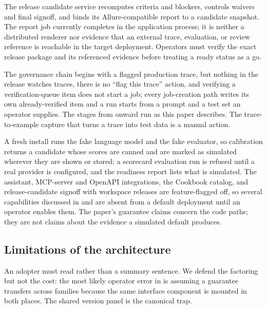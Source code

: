  The release
candidate service recomputes criteria and blockers, controls waivers and final
signoff, and binds its Allure-compatible report to a candidate snapshot.  The
report job currently completes in the application process; it is neither a
distributed renderer nor evidence that an external trace, evaluation, or review
reference is reachable in the target deployment.  Operators must verify the exact
release package and its referenced evidence before treating a ready status as a go.

 The governance chain
begins with a flagged production trace, but nothing in the release watches traces,
there is no ``flag this trace'' action, and verifying a verification-queue item does
not start a job; every job-creation path writes its own already-verified item and a
run starts from a prompt and a test set an operator supplies. The stages from
 onward run as this paper describes. The trace-to-example capture that
turns a trace into test data is a manual action.

 A fresh install runs
the fake language model and the fake evaluator, so calibration returns a candidate
whose scores are canned and are marked as simulated wherever they are shown or
stored; a scorecard evaluation run is refused until a real provider is configured,
and the readiness report lists what is simulated. The \aria{} assistant, MCP-server
and OpenAPI integrations, the Cookbook catalog, and release-candidate signoff with
workspace releases are feature-flagged off, so several capabilities discussed in
 and  are absent from a default
deployment until an operator enables them. The paper's guarantee claims concern the
code paths; they are not claims about the evidence a simulated default produces.

\subsection{Limitations of the architecture}

 An adopter must read
 rather than a summary sentence. We defend the factoring but
not the cost: the most likely operator error in \sys is assuming a guarantee
transfers across families because the same interface component is mounted in both
places. The shared version panel is the canonical trap.

